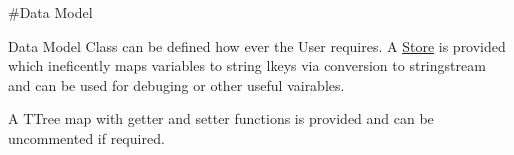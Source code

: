 \#\+Data Model 


Data Model Class can be defined how ever the User requires. A \mbox{\hyperlink{classStore}{Store}} is provided which ineficently maps variables to string lkeys via conversion to stringstream and can be used for debuging or other useful vairables.

A TTree map with getter and setter functions is provided and can be uncommented if required. 
